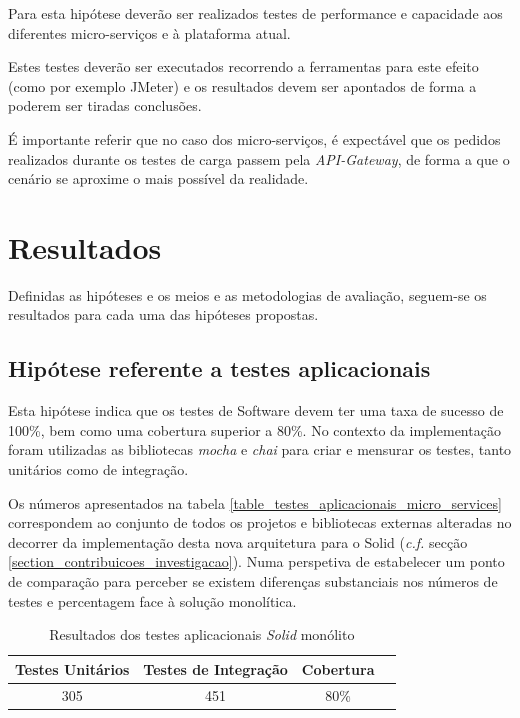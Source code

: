 Para esta hipótese deverão ser realizados testes de performance e capacidade aos diferentes micro-serviços e à plataforma atual.

Estes testes deverão ser executados recorrendo a ferramentas para este efeito (como por exemplo JMeter) e os resultados devem ser apontados de forma a poderem ser tiradas conclusões.

É importante referir que no caso dos micro-serviços, é expectável que os pedidos realizados durante os testes de carga passem pela \emph{API-Gateway}, de forma a que o cenário se aproxime o mais possível da realidade.

\section{Resultados}
Definidas as hipóteses e os meios e as metodologias de avaliação, seguem-se os resultados para cada uma das hipóteses propostas.

\subsection{Hipótese referente a testes aplicacionais}
Esta hipótese indica que os testes de Software devem ter uma taxa de sucesso de 100\%, bem como uma cobertura superior a 80\%.
No contexto da implementação foram utilizadas as bibliotecas \emph{mocha} e \emph{chai} para criar e mensurar os testes, tanto unitários como de integração.

Os números apresentados na tabela \ref{table_testes_aplicacionais_micro_services} correspondem ao conjunto de todos os projetos e bibliotecas externas alteradas no decorrer da implementação desta nova arquitetura para o Solid (\emph{c.f.} secção \ref{section_contribuicoes_investigacao}).
Numa perspetiva de estabelecer um ponto de comparação para perceber se existem diferenças substanciais nos números de testes e percentagem face à solução monolítica.

\begin{table}[h]
\centering
\caption{Resultados dos testes aplicacionais \emph{Solid} monólito}
\vspace{0.5cm}
\label{table_testes_aplicacionais_monolito}
\begin{tabular}{c|c|c|c} 
Testes Unitários & Testes de Integração & Cobertura \\
\hline                          
305 & 451 & 80\% \\
\end{tabular}
\end{table}

